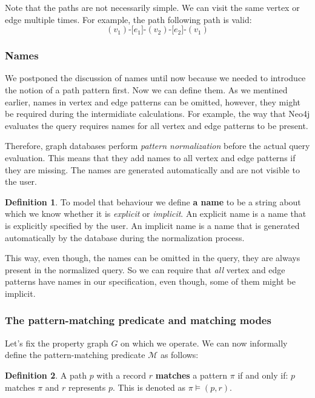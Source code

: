 \documentclass[14pt]{constructor-thesis}
\theoremstyle{definition}
\newtheorem*{definition}{Definition}
\begin{document}
Note that the paths are not necessarily simple. We can visit the same vertex or edge multiple times. For example, the path following path is valid:
$$(v_1) \texttt{-[} e_1 \texttt{]-} (v_2) \texttt{-[} e_2 \texttt{]-} (v_1)$$

\subsubsection{Names}

We postponed the discussion of names until now because we needed to introduce the notion of a path pattern first. Now we can define them. As we mentined earlier, names in vertex and edge patterns can be omitted, however, they might be required during the intermidiate calculations. For example, the way that Neo4j evaluates the query requires names for all vertex and edge patterns to be present. 

Therefore, graph databases perform \textit{pattern normalization} before the actual query evaluation. This means that they add names to all vertex and edge patterns if they are missing. The names are generated automatically and are not visible to the user.

\begin{definition}
  To model that behaviour we define \textbf{a name} to be a string about which we know whether it is \textit{explicit} or \textit{implicit}. An explicit name is a name that is explicitly specified by the user. An implicit name is a name that is generated automatically by the database during the normalization process.
\end{definition}

This way, even though, the names can be omitted in the query, they are always present in the normalized query. So we can require that \textit{all} vertex and edge patterns have names in our specification, even though, some of them might be implicit.

\subsubsection{The pattern-matching predicate and matching modes}

Let's fix the property graph $G$ on which we operate. We can now informally define the pattern-matching predicate $\mathcal{M}$ as follows:

\begin{definition}
   A path $p$ with a record $r$ \textbf{matches} a pattern $\pi$ if and only if: $p$ matches $\pi$ and $r$ represents $p$. This is denoted as $\pi \models (p, r)$.
\end{definition}
\end{document}

